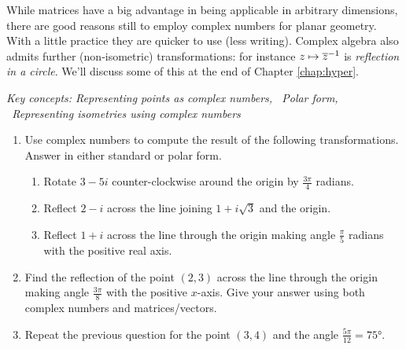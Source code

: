 \label{pg:refcircle}
While matrices have a big advantage in being applicable in arbitrary dimensions, there are good reasons still to employ complex numbers for planar geometry. With a little practice they are quicker to use (less writing). Complex algebra also admits further (non-isometric) transformations: for instance $z\mapsto\overline{z}^{-1}$ is \emph{reflection in a circle}. We'll discuss some of this at the end of Chapter \ref{chap:hyper}.

\vfil

\begin{exercises}
\hangindent\leftmargini\emph{Key concepts: Representing points as complex numbers, \ Polar form, \ Representing isometries using complex numbers}

	\begin{enumerate}
		\item Use complex numbers to compute the result of the following transformations. Answer in either standard or polar form.
	  \begin{enumerate}
	    \item Rotate $3-5i$ counter-clockwise around the origin by $\frac{3\pi}4$ radians.
	    \item Reflect $2-i$ across the line joining $1+i\sqrt 3$ and the origin.
	    \item Reflect $1+i$ across the line through the origin making angle $\frac\pi 5$ radians with the positive real axis.
	  \end{enumerate}
	  
	  
	  \item Find the reflection of the point $(2,3)$ across the line through the origin making angle $\frac{3\pi}8$ with the positive $x$-axis. Give your answer using both complex numbers and matrices/vectors.
	  
	  
		\item Repeat the previous question for the point $(3,4)$ and the angle $\frac{5\pi}{12}=\ang{75}$.
	  

\end{enumerate}
\end{exercises}
